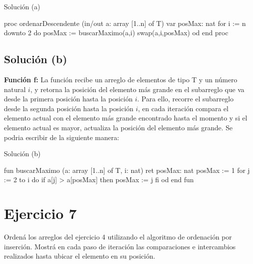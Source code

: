 \begin{codebox}{Solución (a)}
\begin{pascallike}
proc ordenarDescendente (in/out a: array [1..n] of T)
    var posMax: nat
    for i := n downto 2 do
    posMax := buscarMaximo(a,i)
    swap(a,i,posMax)
    od
end proc
\end{pascallike}
\end{codebox}

\subsection{Solución (b)}
\textbf{Función f:} La función recibe un arreglo de elementos de tipo T y un número natural $i$, y retorna la posición del elemento más grande en el subarreglo que va desde la primera posición hasta la posición $i$. Para ello, recorre el subarreglo desde la segunda posición hasta la posición $i$, en cada iteración compara el elemento actual con el elemento más grande encontrado hasta el momento y si el elemento actual es mayor, actualiza la posición del elemento más grande.
Se podria escribir de la siguiente manera:

\begin{codebox}{Solución (b)}
\begin{pascallike}
fun buscarMaximo (a: array [1..n] of T, i: nat) ret posMax: nat
    posMax := 1
    for j := 2 to i do
    if a[j] > a[posMax] then
        posMax := j
    fi
    od
end fun
\end{pascallike}
\end{codebox}

\section{Ejercicio 7}
Ordená los arreglos del ejercicio 4 utilizando el algoritmo de ordenación por inserción. Mostrá en cada paso de iteración las comparaciones e intercambios realizados hasta ubicar el elemento en su posición.

